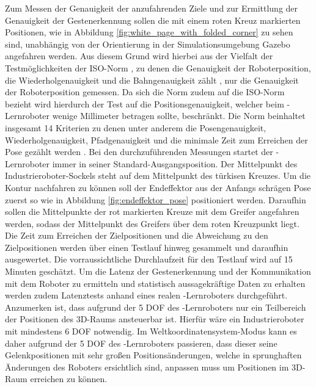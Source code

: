 Zum Messen der Genauigkeit der anzufahrenden Ziele und zur Ermittlung der Genauigkeit der Gestenerkennung sollen die mit einem roten Kreuz markierten Positionen, wie in Abbildung \ref{fig:white_page_with_folded_corner} zu sehen sind, unabhängig von der Orientierung in der Simulationsumgebung Gazebo angefahren werden. Aus diesem Grund wird hierbei aus der Vielfalt der Testmöglichkeiten der ISO-Norm , zu denen die Genauigkeit der Roboterposition, die Wiederholgenauigkeit und die Bahngenauigkeit zählt \cite{1400-1700_iso_nodate}, nur die Genauigkeit der Roboterposition gemessen. Da sich die Norm  zudem auf die ISO-Norm  bezieht wird hierdurch der Test auf die Positionsgenauigkeit, welcher beim -Lernroboter wenige Millimeter betragen sollte, beschränkt. Die Norm  beinhaltet insgesamt 14 Kriterien zu denen unter anderem die Posengenauigkeit, Wiederholgenauigkeit, Pfadgenauigkeit und die minimale Zeit zum Erreichen der Pose gezählt werden \cite{1400-1700_isotr_nodate}. Bei den durchzuführenden Messungen startet der -Lernroboter immer in seiner Standard-Ausgangsposition. Der Mittelpunkt des Industrieroboter-Sockels steht auf dem Mittelpunkt des türkisen Kreuzes. Um die Kontur nachfahren zu können soll der Endeffektor aus der Anfangs schrägen Pose zuerst so wie in Abbildung \ref{fig:endeffektor_pose} positioniert werden. Daraufhin sollen die Mittelpunkte der rot markierten Kreuze mit dem Greifer angefahren werden, sodass der Mittelpunkt des Greifers über dem roten Kreuzpunkt liegt. Die Zeit zum Erreichen der Zielpositionen und die Abweichung zu den Zielpositionen werden über einen Testlauf hinweg gesammelt und daraufhin ausgewertet. Die vorraussichtliche Durchlaufzeit für den Testlauf wird auf 15 Minuten geschätzt. Um die Latenz der Gestenerkennung und der Kommunikation mit dem Roboter zu ermitteln und statistisch aussagekräftige Daten zu erhalten werden zudem Latenztests anhand eines realen -Lernroboters durchgeführt. Anzumerken ist, dass aufgrund der 5 DOF des -Lernroboters nur ein Teilbereich der Positionen des 3D-Raums ansteuerbar ist. Hierfür wäre ein Industrieroboter mit mindestens 6 DOF notwendig. Im Weltkoordinatensystem-Modus kann es daher aufgrund der 5 DOF des -Lernroboters passieren, dass dieser seine Gelenkpositionen mit sehr großen Positionsänderungen, welche in sprunghaften Änderungen des Roboters ersichtlich sind, anpassen muss um Positionen im 3D-Raum erreichen zu können.

